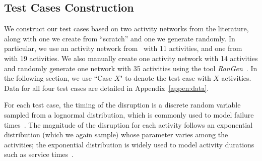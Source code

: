 \documentclass[11pt]{article}
\begin{document}
	\subsection{Test Cases Construction} \label{subsec:testcases}
	
	
	We construct our test cases based on two activity networks from the literature, along with one we create from ``scratch'' and one we generate randomly. In particular, we use an activity network from~\citet{plambeck1996sample} with 11 activities, and %
	one from~\citet{Elmaghraby77} with 19 activities. 
	 We also manually create one activity network with 14 activities and randomly generate one network with 35 activities using the tool \emph{RanGen}~\citep{demeulemeester2003rangen}.
	 In the following section, we use ``Case \(X\)" to denote the test case with \(X\) activities. Data for all four test cases are detailed in Appendix~\ref{appen:data}.
	
	For each test case, the timing of the disruption is a discrete random variable sampled from a lognormal distribution, which is commonly used to model failure times~\citep[e.g.,][]{crow1987lognormal,mullen1998lognormal}. The magnitude of the disruption for each activity follows an exponential distribution (which we again sample) whose parameter varies among the activities; the exponential distribution is widely used to model activity durations such as service times~\citep[e.g.,][]{ross1996stochastic}.
\end{document}

